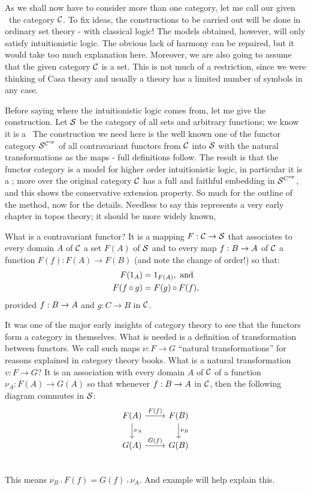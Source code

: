 As we shall now have to consider more than one category, let me call our given \ccc\ the category $\C$. To fix ideas, the constructions to be carried out will be done in ordinary set theory - with classical logic! The models obtained, however, will only satisfy intuitionistic logic. The obvious lack of harmony can be repaired, but it would take too much explanation here.	Moreover, we are also going to assume that the given category $\C$ is a set. This is not much of a restriction, since we were thinking of Casa theory and usually a theory has a limited number of symbols in any case.

Before saying where the intuitionistic logic comes from, let me give the construction. Let $\S$ be the category of all sets and arbitrary functions; we know it is a \ccc\  The construction we need here is the well known one of the functor category $\scop$ of all contravariant functors from $\C$ into $\S$ with the natural transformations as the maps - full definitions follow. The result is that the functor category is a model for higher order intuitionistic logic, in particular it is a \ccc; more over the original category $\C$ has a full and faithful embedding in $\S^{C^{op}}$, and this shows the conservative extension property. So much for the outline of the method, now for the details. Needless to say this represents a very early chapter in topos theory; it should be more widely known,

What is a contravariant functor? It is a mapping $F: \C\to \S$ that associates to every domain $A$ of $\C$ a set $F(A)$ of $\S$ and to every map $f: \BA$ of $\C$ a function $F(f) : F(A) \to F(B)$ (and note the change of order!) so that:
\begin{align*}
F(\id_A) &= \id_{F(A)} , {\textrm{ and}}\\
F(f \comp g) &= F(g) \comp F(f),
\end{align*}
%
provided $f: \BA$ and $g: C \to B$ in $\C$.

It was one of the major early insights of category theory to see that the functors form
a category in themselves. What is needed is a definition of transformation between functors. We call such maps $\nu : F \to G$ ``natural transformations'' for reasons explained in category theory books. What is a natural transformation $v : F\to G$? It is an association with every domain $A$ of $\C$ of a function $\nu_A: F(A)\to G(A)$ so that whenever $f : \BA$ in $\C$, then the following diagram commutes in $\S$:
\[
  \begin{tikzcd}
    F(A) \arrow{d}{\nu_A} \arrow{r}{F(f)}  & F(B) \arrow{d}{\nu_B} \\
    G(A)  \arrow{r}{G(f)} & G(B)\\
  \end{tikzcd}
\]
This means $\nu_B \comp F(f) = G(f) \comp \nu_A$. And example will help explain this.

